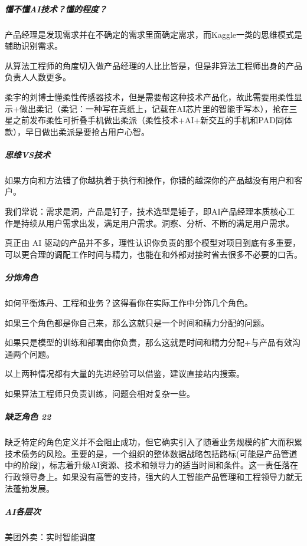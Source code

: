 \documentclass[letterpaper,10pt,english]{sphinxmanual}
\begin{document}
\subparagraph{懂不懂AI技术？懂的程度？}
\label{\detokenize{chapter_introduction/AI_PM:id20}}
产品经理是发现需求并在不确定的需求里面确定需求，而Kaggle一类的思维模式是辅助识别需求。

从算法工程师的角度切入做产品经理的人比比皆是，但是非算法工程师出身的产品负责人人数更多。

柔宇的刘博士懂柔性传感器技术，但是需要帮这种技术产品化，故此需要用柔性显示+做出柔记（柔记：一种写在真纸上，记载在AI芯片里的智能手写本），抢在三星之前发布柔性可折叠手机做出柔派（柔性技术+AI+新交互的手机和PAD同体款），早日做出柔派是要抢占用户心智。


\subparagraph{思维VS技术}
\label{\detokenize{chapter_introduction/AI_PM:vs}}
如果方向和方法错了你越执着于执行和操作，你错的越深你的产品越没有用户和客户。

我们常说：需求是洞，产品是钉子，技术选型是锤子，即AI产品经理本质核心工作是持续从用户需求出发，满足用户需求。洞察、分析、不断的满足用户需求。

真正由 AI
驱动的产品并不多，理性认识你负责的那个模型对项目到底有多重要，可以更合理的调配工作时间与精力，也能在和外部对接时省去很多不必要的口舌。


\subparagraph{分饰角色}
\label{\detokenize{chapter_introduction/AI_PM:id21}}
如何平衡炼丹、工程和业务？这得看你在实际工作中分饰几个角色。

如果三个角色都是你自己来，那么这就只是一个时间和精力分配的问题。

如果只是模型的训练和部署由你负责，那么这就是时间和精力分配+与产品有效沟通两个问题。

以上两种情况都有大量的先进经验可以借鉴，建议直接站内搜索。

如果算法工程师只负责训练，问题会相对复杂一些。


\subparagraph{缺乏角色 22\sphinxfootnotemark[293]}
\label{\detokenize{chapter_introduction/AI_PM:id22}}%
\begin{footnotetext}[293]\sphinxAtStartFootnote
{}
%
\end{footnotetext}\ignorespaces 
缺乏特定的角色定义并不会阻止成功，但它确实引入了随着业务规模的扩大而积累技术债务的风险。重要的是，一个组织的整体数据战略包括路标(可能是产品管道中的阶段)，标志着升级AI资源、技术和领导力的适当时间和条件。这一责任落在行政领导身上。如果没有高管的支持，强大的人工智能产品管理和工程领导力就无法蓬勃发展。


\subparagraph{AI各层次}
\label{\detokenize{chapter_introduction/AI_PM:id23}}
美团外卖：实时智能调度
\end{document}
